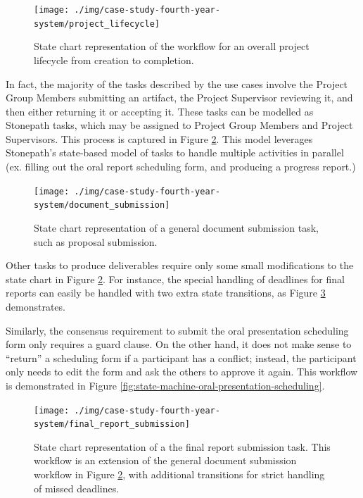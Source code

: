 \documentclass[document.tex]{subfiles}
\begin{document}
\begin{figure}[!htbp]
\centering \texttt{[image: ./img/case-study-fourth-year-system/project\_lifecycle]}
\caption{State chart representation of the workflow for an overall project lifecycle from creation to completion.}
\label{fig:state-machine-project-lifecycle}
\end{figure}

In fact, the majority of the tasks described by the use cases involve the Project Group Members submitting an artifact, the Project Supervisor reviewing it, and then either returning it or accepting it. These tasks can be modelled as Stonepath tasks, which may be assigned to Project Group Members and Project Supervisors. This process is captured in Figure \ref{fig:state-machine-document-submission}. This model leverages Stonepath’s state-based model of tasks to handle multiple activities in parallel (ex. filling out the oral report scheduling form, and producing a progress report.)

\begin{figure}[!htbp]
\centering \texttt{[image: ./img/case-study-fourth-year-system/document\_submission]}
\caption{State chart representation of a general document submission task, such as proposal submission.}
\label{fig:state-machine-document-submission}
\end{figure}

Other tasks to produce deliverables require only some small modifications to the state chart in Figure \ref{fig:state-machine-document-submission}. For instance, the special handling of deadlines for final reports can easily be handled with two extra state transitions, as Figure \ref{fig:state-machine-final-report-submission} demonstrates.

Similarly, the consensus requirement to submit the oral presentation scheduling form only requires a guard clause. On the other hand, it does not make sense to ``return'' a scheduling form if a participant has a conflict; instead, the participant only needs to edit the form and ask the others to approve it again. This workflow is demonstrated in Figure \ref{fig:state-machine-oral-presentation-scheduling}.

\begin{figure}[!htbp]
\centering \texttt{[image: ./img/case-study-fourth-year-system/final\_report\_submission]}
\caption{State chart representation of a the final report submission task. This workflow is an extension of the general document submission workflow in Figure \ref{fig:state-machine-document-submission}, with additional transitions for strict handling of missed deadlines.}
\label{fig:state-machine-final-report-submission}
\end{figure}
\end{document}
